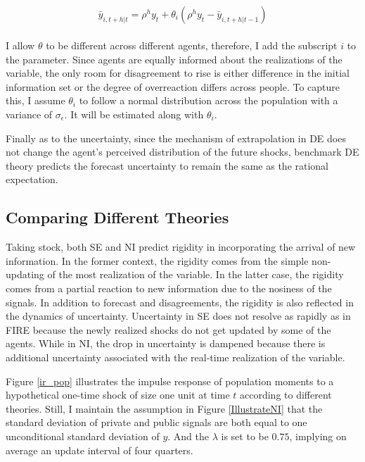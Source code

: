\documentclass[12pt]{article}
\begin{document}
		\begin{eqnarray}
		\begin{aligned}
			\bar y_{i,t+h|t}  =  \rho^h y_{t} + \theta_i (\rho^h y_t - \bar y_{i,t+h|t-1})
		\end{aligned}
	\end{eqnarray}
	
	 I allow $\theta$ to be different across different agents, therefore, I add the subscript $i$ to the parameter. Since agents are equally informed about the realizations of the variable, the only room for disagreement to rise is either difference in the initial information set or the degree of overreaction differs across people. To capture this, I assume $\theta_i$ to follow a normal distribution across the population with a variance of $\sigma_{\epsilon}$. It will be estimated along with $\theta_i$. 
	 
	 Finally as to the uncertainty, since the mechanism of extrapolation in DE does not change the agent's perceived distribution of the future shocks, benchmark DE theory predicts the forecast uncertainty to remain the same as the rational expectation. 

 	
	\subsection{Comparing Different Theories}
	
	Taking stock, both SE and NI predict rigidity in incorporating the arrival of new information. In the former context, the rigidity comes from the simple non-updating of the most realization of the variable. In the latter case, the rigidity comes from a partial reaction to new information due to the nosiness of the signals.  In addition to forecast and disagreements, the rigidity is also reflected in the dynamics of uncertainty.  Uncertainty in SE does not resolve as rapidly as in FIRE because the newly realized shocks do not get updated by some of the agents. While in NI, the drop in uncertainty is dampened because there is additional uncertainty associated with the real-time realization of the variable.  
	
	Figure \ref{ir_pop} illustrates the impulse response of population moments to a hypothetical one-time shock of size one unit at time $t$ according to different theories. Still, I maintain the assumption in Figure \ref{IllustrateNI} that the standard deviation of private and public signals are both equal to one unconditional standard deviation of $y$.  And the $\lambda$ is set to be $0.75$, implying on average an update interval of four quarters.  
	
\end{document}
